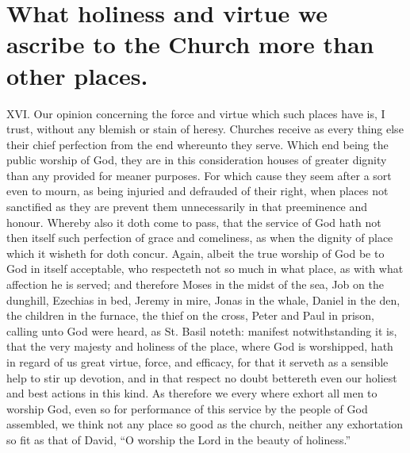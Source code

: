 \section*{What holiness and virtue we ascribe to the Church more than other places.}
XVI. Our opinion concerning the force and virtue which such places have is, I trust, without any blemish or stain of heresy. Churches receive as every thing else their chief perfection from the end whereunto they serve. Which end being the public worship of God, they are in this consideration houses of greater dignity than any provided for meaner purposes. For which cause they seem after a sort even to mourn, as being injuried and defrauded of their right, when places not sanctified as they are prevent them unnecessarily in that preeminence and honour. Whereby also it doth come to pass, that the service of God hath not then itself such perfection of grace and comeliness, as when the dignity of place which it wisheth for doth concur.
Again, albeit the true worship of God be to God in itself acceptable, who respecteth not so much in what place, as with what affection he is served; and therefore Moses in the midst of the sea, Job on the dunghill, Ezechias in bed, Jeremy in mire, Jonas in the whale, Daniel in the den, the children in the furnace, the thief on the cross, Peter and Paul in prison, calling unto God were heard, as St. Basil noteth: manifest notwithstanding it is, that the very majesty and holiness of the place, where God is worshipped, hath in regard of us great virtue, force, and efficacy, for that it serveth as a sensible help to stir up devotion, and in that respect no doubt bettereth even our holiest and best actions in this kind. As therefore we every where exhort all men to  worship God, even so for performance of this service by the people of God assembled, we think not any place so good as the church, neither any exhortation so fit as that of David, “O worship the Lord in the beauty of holiness.”

